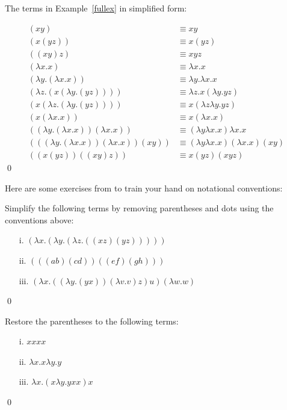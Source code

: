 \documentclass[11pt]{article}
\begin{document}
\begin{uexample}
The terms in Example~\ref{fullex} in simplified form:

\begin{align*}
(xy) &\equiv xy\\
(x(yz)) &\equiv x(yz)\\
((xy)z) &\equiv xyz\\
(\lambda x.x) &\equiv \lambda x.x\\
(\lambda y.(\lambda x.x)) &\equiv \lambda y.\lambda x.x\\
(\lambda z.(x(\lambda y.(yz)))) &\equiv \lambda z.x(\lambda y.yz)\\
(x(\lambda z.(\lambda y.(yz)))) &\equiv x(\lambda z\lambda y.yz)\\
(x(\lambda x.x)) &\equiv x(\lambda x.x)\\
((\lambda y.(\lambda x.x))(\lambda x.x)) &\equiv (\lambda y\lambda x.x)\lambda x.x\\
(((\lambda y.(\lambda x.x))(\lambda x.x))(xy)) &\equiv (\lambda y\lambda x.x)(\lambda x.x)(xy)\\
((x(yz))((xy)z)) &\equiv x(yz)(xyz)
\end{align*}
\qed
\end{uexample}

Here are some exercises from \cite{selinger13} to train your hand on notational conventions:

\begin{uexercise}
Simplify the following terms by removing parentheses and dots using the conventions above:
\begin{itemize}
\item[i.] $(\lambda x.(\lambda y.(\lambda z.((xz)(yz)))))$
\item[ii.] $(((ab)(cd))((ef)(gh)))$
\item[iii.] $(\lambda x.((\lambda y.(yx))(\lambda v.v)z)u)(\lambda w.w)$
\end{itemize}
\qed
\end{uexercise}

\begin{uexercise}
Restore the parentheses to the following terms:
\begin{itemize}
\item[i.] $xxxx$
\item[ii.] $\lambda x.x\lambda y.y$
\item[iii.] $\lambda x.(x\lambda y.yxx)x$
\end{itemize}
\qed
\end{uexercise}
\end{document}
